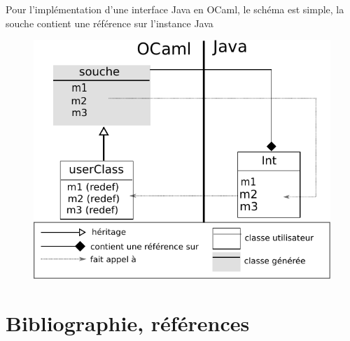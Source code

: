 \documentclass[a4paper, 11pt]{article}
\begin{document}
Pour l'implémentation d'une interface Java en OCaml, le schéma est simple, la souche contient une référence sur l'instance Java 

\begin{figure}[h!]
  \centering
  \includegraphics[scale=0.7]{schemaCBIntSimple.pdf}
\end{figure}




\newpage
\section*{Bibliographie, références}
\end{document}
